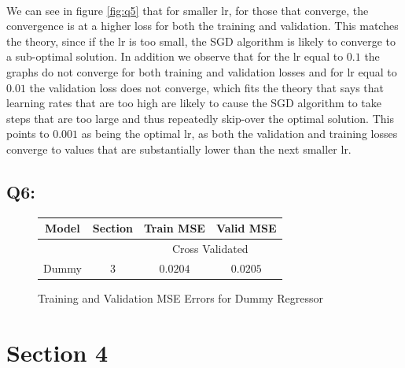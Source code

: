\documentclass{article}
\begin{document}
    \paragraph*{}
    We can see in figure \ref{fig:q5} that for smaller lr, for those that converge, the convergence is at a higher loss for both the training and validation. This matches the theory, since if the lr is too small, the SGD algorithm is likely to converge to a sub-optimal solution. In addition we observe that for the lr equal to $0.1$ the graphs do not converge for both training and validation losses and for lr equal to $0.01$ the validation loss does not converge, which fits the theory that says that learning rates that are too high are likely to cause the SGD algorithm to take steps that are too large and thus repeatedly skip-over the optimal solution. This points to $0.001$ as being the optimal lr, as both the validation and training losses converge to values that are substantially lower than the next smaller lr.
\subsection*{Q6:}
    \begin{figure}[H]
        \centering
        \begin{tabular}{|c|c|c|c|}
            \hline
            \rowcolor{gray!60}
            Model & Section & Train MSE & Valid MSE\\ \hline
            \rowcolor{gray!20}
            ~&~ & \multicolumn{2}{c|}{Cross Validated}\\ \hline
            Dummy & 3 & $0.0204$ & $0.0205$\\ \hline
        \end{tabular}
        \caption{Training and Validation MSE Errors for Dummy Regressor}
    \end{figure}
\section*{Section 4}
\end{document}
